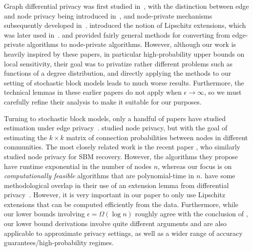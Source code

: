 \documentclass{article}
\begin{document}
Graph differential privacy was first studied in~\cite{NisEtal07, hay2009accurate, karwa2011private, gupta2012iterative, karwa2012differentially, blocki2012johnson}, with the distinction between edge and node privacy being introduced in~\cite{hay2009accurate}, and node-private mechanisms subsequently developed in~\cite{blocki2013differentially, kasiviswanathan2013analyzing, chen2013recursive, raskhodnikova2015efficient}. \cite{kasiviswanathan2013analyzing, chen2013recursive} introduced the notion of Lipschitz extensions, which was later used in~\cite{borgs2015private, borgs2018revealing, borgs2018private}. \cite{blocki2013differentially} and \cite{kasiviswanathan2013analyzing} provided fairly general methods for converting from edge-private algorithms to node-private algorithms. However, although our work is heavily inspired by these papers, in particular high-probability upper bounds on local sensitivity, their goal was to privatize rather different problems such as functions of a degree distribution, and directly applying the methods to our setting of stochastic block models leads to much worse results. Furthermore, the technical lemmas in these earlier papers do not apply when $\epsilon \rightarrow \infty$, so we must carefully refine their analysis to make it suitable for our purposes.

Turning to stochastic block models, only a handful of papers have studied estimation under edge privacy~\cite{HehEtal22, mohamed2022differentially, CheEtal23, chakraborty2024prime, nguyen2024differentially, koskela2025price}. \cite{chen2024private} studied node privacy, but with the goal of estimating the $k \times k$ matrix of connection probabilities between nodes in different communities. The most closely related work is the recent paper \cite{klopp2026node}, who similarly studied node privacy for SBM recovery. However, the algorithms they propose have runtime exponential in the number of nodes $n$, whereas our focus is on \emph{computationally feasible} algorithms that are polynomial-time in $n$. \cite{klopp2026node} have some methodological overlap in their use of an extension lemma from differential privacy~\cite{borgs2018private}. However, it is very important in our paper to only use Lipschitz extensions that can be computed efficiently from the data. Furthermore, while our lower bounds involving $\epsilon = \Omega(\log n)$ roughly agree with the conclusion of \cite{klopp2026node}, our lower bound derivations involve quite different arguments and are also applicable to approximate privacy settings, as well as a wider range of accuracy guarantees/high-probability regimes.
\end{document}
